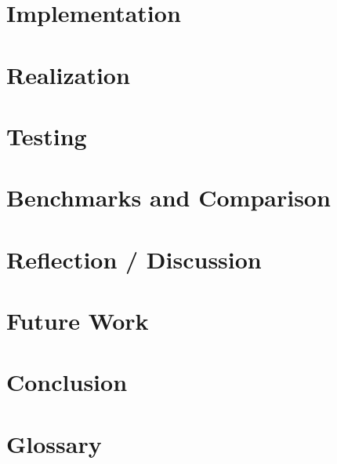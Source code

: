 \documentclass[oribibl]{llncs}
\numberwithin{equation}{section}
\begin{document}
	\section{Implementation}
	
	\label{implementation}
	
	\section{Realization}
	
	\label{realization}
		
	\section{Testing}
	
	\label{testing}
		
	\section{Benchmarks and Comparison}
	
	\label{bandc}
	
	\section{Reflection / Discussion}
	
	\label{reflection}
		
	\section{Future Work}
	
	\label{futurework}
	
	\section{Conclusion}
	
	
	\label{conclusion}
		
	\section{Glossary}
	
	
		
\end{document}
